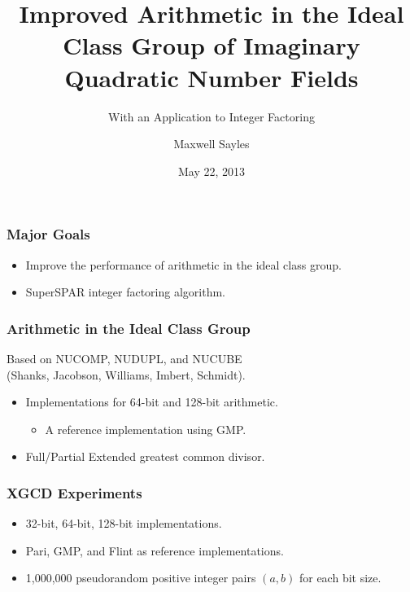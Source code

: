 \documentclass{beamer}
\title[]{Improved Arithmetic in the Ideal Class Group of Imaginary Quadratic Number Fields}
\subtitle{With an Application to Integer Factoring}
\author{Maxwell Sayles}
\date{May 22, 2013}
\institute{
	\bigskip 
       Department of Computer Science \\
       University of Calgary
}
\begin{document}
\maketitle

\begin{frame}
\frametitle{Major Goals}
\begin{itemize}
\item Improve the performance of arithmetic in the ideal class group.
\item SuperSPAR integer factoring algorithm.
\end{itemize}
\end{frame}

  
\begin{frame}
\frametitle{Arithmetic in the Ideal Class Group}
Based on NUCOMP, NUDUPL, and NUCUBE \\(Shanks, Jacobson, Williams, Imbert, Schmidt).

\begin{itemize}
\item Implementations for 64-bit and 128-bit arithmetic.
	\begin{itemize}
	\item A reference implementation using GMP.
	\end{itemize}
\item Full/Partial Extended greatest common divisor.
\end{itemize}

\end{frame}


\begin{frame}
\frametitle{XGCD Experiments}
\begin{itemize}
\item 32-bit, 64-bit, 128-bit implementations.
\item Pari, GMP, and Flint as reference implementations.
\item 1,000,000 pseudorandom positive integer pairs $(a,b)$ for each bit size.
\end{itemize}
\end{frame}
\end{document}
